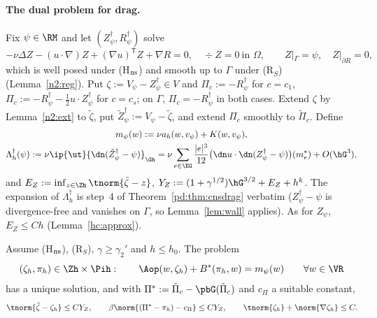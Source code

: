 \paragraph{The dual problem for drag.} Fix $\psi\in\RM$ and let $(Z^\dagger_\psi,R^\dagger_\psi)$ solve
\[
-\nu\Delta Z-(u\cdot\nabla)Z+(\nabla u)^{\mathsf T}Z+\nabla R=0,\quad\div Z=0\ \text{in }\Omega,\qquad Z|_\Gamma=\psi,\quad Z|_{\partial R}=0,
\]
which is well posed under (H$_{\rm ns}$) and smooth up to $\Gamma$ under (R$_S$) (Lemma~\ref{n2:reg}). Put $\zeta:=V_\psi-Z^\dagger_\psi\in V$ and
$\Pi_c:=-R^\dagger_\psi$ for $c=c_1$, $\Pi_c:=-R^\dagger_\psi-\frac12u\cdot Z^\dagger_\psi$ for $c=c_s$; on $\Gamma$, $\Pi_c=-R^\dagger_\psi$ in both cases.
Extend $\zeta$ by Lemma~\ref{n2:ext} to $\tilde\zeta$, put $\tilde Z^\dagger_\psi:=V_\psi-\tilde\zeta$, and extend $\Pi_c$ smoothly to $\tilde\Pi_c$. Define
\begin{gather*}
m_\psi(w):=\nu a_h(w,v_\psi)+K(w,v_\psi),\\
\Lambda^\dagger_h(\psi):=\nu\ip{\ut}{\dn(\tilde Z^\dagger_\psi-\psi)}_{\Gh}=\nu\sum_{e\in\EG}\frac{|e|^3}{12}\bigl(\dn u\cdot\dn(Z^\dagger_\psi-\psi)\bigr)(m_e^\ast)+O(\hG^3),
\end{gather*}
and $E_Z:=\inf_{z\in\Zh}\tnorm{\tilde\zeta-z}$, $Y_Z:=(1+\gamma^{1/2})\hG^{3/2}+E_Z+h^k$. The expansion of $\Lambda^\dagger_h$ is step~4 of
Theorem~\ref{pd:thm:cnsdrag} verbatim ($Z^\dagger_\psi-\psi$ is divergence-free and vanishes on $\Gamma$, so Lemma~\ref{lem:wall} applies).
As for $Z_\psi$, $E_Z\le Ch$ (Lemma~\ref{hc:approx}).

\begin{lemma}\label{n2:aux}
Assume (H$_{\rm ns}$), (R$_S$), $\gamma\ge\gamma_2'$ and $h\le h_0$. The problem
\begin{equation}\label{n2:eq:aux}
(\zeta_h,\pi_h)\in\Zh\times\Pih:\qquad \Aop(w,\zeta_h)+B^\ast(\pi_h,w)=m_\psi(w)\qquad\forall w\in\VR
\end{equation}
has a unique solution, and with $\Pi^\ast:=\tilde\Pi_c-\pbG(\tilde\Pi_c)$ and $c_\Pi$ a suitable constant,
\[
\tnorm{\tilde\zeta-\zeta_h}\le CY_Z,\qquad \beta\norm{(\Pi^\ast-\pi_h)-c_\Pi}\le CY_Z,\qquad \tnorm{\zeta_h}+\norm{\nabla\zeta_h}\le C .
\]
\end{lemma}

